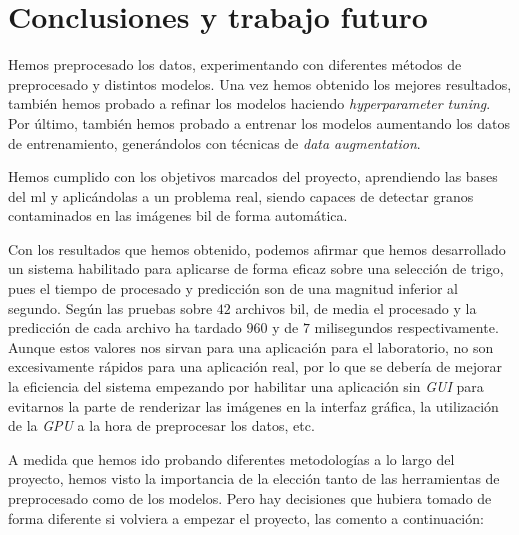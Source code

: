 \section{Conclusiones y trabajo futuro}\label{sec:conclusiones}

Hemos preprocesado los datos, experimentando con diferentes métodos de preprocesado y distintos modelos. Una vez hemos obtenido los mejores resultados, también hemos probado a refinar los modelos haciendo \textit{hyperparameter tuning}. Por último, también hemos probado a entrenar los modelos aumentando los datos de entrenamiento, generándolos con técnicas de \textit{data augmentation}.

Hemos cumplido con los objetivos marcados del proyecto, aprendiendo las bases del \gls{ml} y aplicándolas a un problema real, siendo capaces de detectar granos contaminados en las imágenes \gls{bil} de forma automática.

Con los resultados que hemos obtenido, podemos afirmar que hemos desarrollado un sistema habilitado para aplicarse de forma eficaz sobre una selección de trigo, pues el tiempo de procesado y predicción son de una magnitud inferior al segundo. Según las pruebas sobre $42$ archivos \gls{bil}, de media el procesado y la predicción de cada archivo ha tardado $960$ y de $7$ milisegundos respectivamente. Aunque estos valores nos sirvan para una aplicación para el laboratorio, no son excesivamente rápidos para una aplicación real, por lo que se debería de mejorar la eficiencia del sistema empezando por habilitar una aplicación sin \textit{GUI} para evitarnos la parte de renderizar las imágenes en la interfaz gráfica, la utilización de la \textit{GPU} a la hora de preprocesar los datos, etc. 

A medida que hemos ido probando diferentes metodologías a lo largo del proyecto, hemos visto la importancia de la elección tanto de las herramientas de preprocesado como de los modelos. Pero hay decisiones que hubiera tomado de forma diferente si volviera a empezar el proyecto, las comento a continuación:


